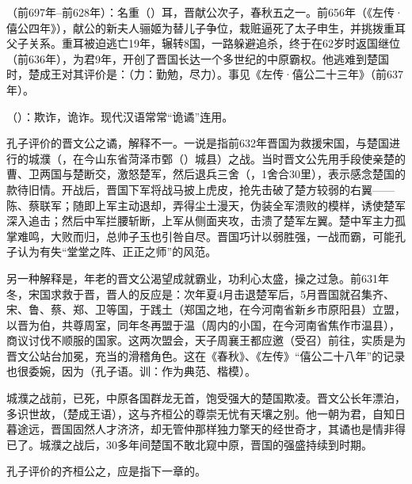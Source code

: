 {
\item {}（前697年--前628年）：名重（）耳，晋献公次子，春秋五之一。前656年（《左传·僖公四年》），献公的新夫人骊姬为替儿子争位，栽赃逼死了太子申生，并挑拨重耳父子关系。重耳被迫逃亡19年，辗转8国，一路躲避追杀，终于在62岁时返国继位（前636年），为君9年，开创了晋国长达一个多世纪的中原霸权。他逃难到楚国时，楚成王对其评价是：（力：勤勉，尽力）。事见《左传·僖公二十三年》（前637年）。

\item {}（）：欺诈，诡诈。现代汉语常常“诡谲”连用。

孔子评价的晋文公之谲，解释不一。一说是指前632年晋国为救援宋国，与楚国进行的城濮（，在今山东省菏泽市鄄（）城县）之战。当时晋文公先用手段使亲楚的曹、卫两国与楚断交，激怒楚军，然后退兵三舍（，1舍合30里），表示感念楚国的款待旧情。开战后，晋国下军将战马披上虎皮，抢先击破了楚方较弱的右翼——陈、蔡联军；随即上军主动退却，弄得尘土漫天，伪装全军溃败的模样，诱使楚军深入追击；然后中军拦腰斩断，上军从侧面夹攻，击溃了楚军左翼。楚中军主力孤掌难鸣，大败而归，总帅子玉也引咎自尽。晋国巧计以弱胜强，一战而霸，可能孔子认为有失“堂堂之阵、正正之师”的风范。

另一种解释是，年老的晋文公渴望成就霸业，功利心太盛，操之过急。前631年冬，宋国求救于晋，晋人的反应是：次年夏4月击退楚军后，5月晋国就召集齐、宋、鲁、蔡、郑、卫等国，于践土（郑国之地，在今河南省新乡市原阳县）立盟，以晋为伯，共尊周室，同年冬再盟于温（周内的小国，在今河南省焦作市温县），商议讨伐不顺服的国家。这两次盟会，天子周襄王都应邀（受召）前往，实质是为晋文公站台加冕，充当的滑稽角色。这在《春秋》、《左传》“僖公二十八年”的记录也很委婉，因为（孔子语。训：作为典范、楷模）。

城濮之战前，已死，中原各国群龙无首，饱受强大的楚国欺凌。晋文公长年漂泊，多识世故，（楚成王语），这与齐桓公的尊崇无忧有天壤之别。他一朝为君，自知日暮途远，晋国固然人才济济，却无管仲那样独力擎天的经世奇才，其谲也是情非得已了。城濮之战后，30多年间楚国不敢北窥中原，晋国的强盛持续到时期。

\item 孔子评价的齐桓公之，应是指下一章的。
}
{}  %


